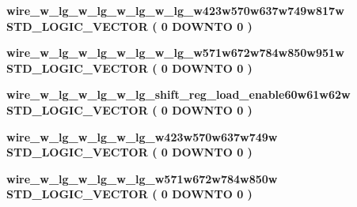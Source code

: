 \begin{DoxyCompactItemize}
\item 
{\bf wire\+\_\+w\+\_\+lg\+\_\+w\+\_\+lg\+\_\+w\+\_\+lg\+\_\+w\+\_\+lg\+\_\+w423w570w637w749w817w} {\bfseries \textcolor{comment}{S\+T\+D\+\_\+\+L\+O\+G\+I\+C\+\_\+\+V\+E\+C\+T\+OR}\textcolor{vhdlchar}{ }\textcolor{vhdlchar}{(}\textcolor{vhdlchar}{ }\textcolor{vhdlchar}{ } \textcolor{vhdldigit}{0} \textcolor{vhdlchar}{ }\textcolor{keywordflow}{D\+O\+W\+N\+TO}\textcolor{vhdlchar}{ }\textcolor{vhdlchar}{ } \textcolor{vhdldigit}{0} \textcolor{vhdlchar}{ }\textcolor{vhdlchar}{)}\textcolor{vhdlchar}{ }} 
\item 
{\bf wire\+\_\+w\+\_\+lg\+\_\+w\+\_\+lg\+\_\+w\+\_\+lg\+\_\+w\+\_\+lg\+\_\+w571w672w784w850w951w} {\bfseries \textcolor{comment}{S\+T\+D\+\_\+\+L\+O\+G\+I\+C\+\_\+\+V\+E\+C\+T\+OR}\textcolor{vhdlchar}{ }\textcolor{vhdlchar}{(}\textcolor{vhdlchar}{ }\textcolor{vhdlchar}{ } \textcolor{vhdldigit}{0} \textcolor{vhdlchar}{ }\textcolor{keywordflow}{D\+O\+W\+N\+TO}\textcolor{vhdlchar}{ }\textcolor{vhdlchar}{ } \textcolor{vhdldigit}{0} \textcolor{vhdlchar}{ }\textcolor{vhdlchar}{)}\textcolor{vhdlchar}{ }} 
\item 
{\bf wire\+\_\+w\+\_\+lg\+\_\+w\+\_\+lg\+\_\+w\+\_\+lg\+\_\+shift\+\_\+reg\+\_\+load\+\_\+enable60w61w62w} {\bfseries \textcolor{comment}{S\+T\+D\+\_\+\+L\+O\+G\+I\+C\+\_\+\+V\+E\+C\+T\+OR}\textcolor{vhdlchar}{ }\textcolor{vhdlchar}{(}\textcolor{vhdlchar}{ }\textcolor{vhdlchar}{ } \textcolor{vhdldigit}{0} \textcolor{vhdlchar}{ }\textcolor{keywordflow}{D\+O\+W\+N\+TO}\textcolor{vhdlchar}{ }\textcolor{vhdlchar}{ } \textcolor{vhdldigit}{0} \textcolor{vhdlchar}{ }\textcolor{vhdlchar}{)}\textcolor{vhdlchar}{ }} 
\item 
{\bf wire\+\_\+w\+\_\+lg\+\_\+w\+\_\+lg\+\_\+w\+\_\+lg\+\_\+w423w570w637w749w} {\bfseries \textcolor{comment}{S\+T\+D\+\_\+\+L\+O\+G\+I\+C\+\_\+\+V\+E\+C\+T\+OR}\textcolor{vhdlchar}{ }\textcolor{vhdlchar}{(}\textcolor{vhdlchar}{ }\textcolor{vhdlchar}{ } \textcolor{vhdldigit}{0} \textcolor{vhdlchar}{ }\textcolor{keywordflow}{D\+O\+W\+N\+TO}\textcolor{vhdlchar}{ }\textcolor{vhdlchar}{ } \textcolor{vhdldigit}{0} \textcolor{vhdlchar}{ }\textcolor{vhdlchar}{)}\textcolor{vhdlchar}{ }} 
\item 
{\bf wire\+\_\+w\+\_\+lg\+\_\+w\+\_\+lg\+\_\+w\+\_\+lg\+\_\+w571w672w784w850w} {\bfseries \textcolor{comment}{S\+T\+D\+\_\+\+L\+O\+G\+I\+C\+\_\+\+V\+E\+C\+T\+OR}\textcolor{vhdlchar}{ }\textcolor{vhdlchar}{(}\textcolor{vhdlchar}{ }\textcolor{vhdlchar}{ } \textcolor{vhdldigit}{0} \textcolor{vhdlchar}{ }\textcolor{keywordflow}{D\+O\+W\+N\+TO}\textcolor{vhdlchar}{ }\textcolor{vhdlchar}{ } \textcolor{vhdldigit}{0} \textcolor{vhdlchar}{ }\textcolor{vhdlchar}{)}\textcolor{vhdlchar}{ }} 

\end{DoxyCompactItemize}
